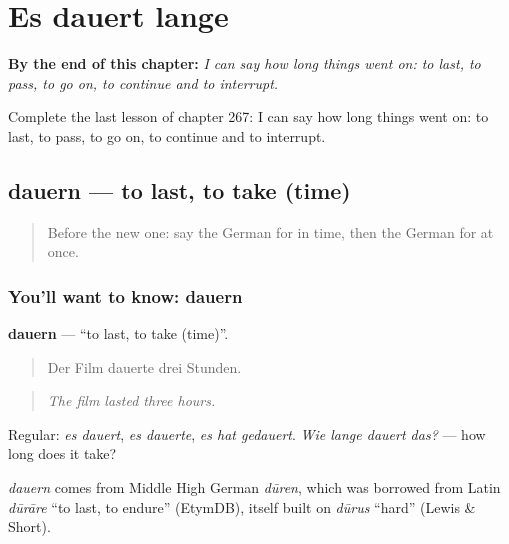 
\chapter{Es dauert lange}
\label{ch:ge-es-dauert-lange}

\begin{chapteropening}
\textbf{By the end of this chapter:} \emph{I can say how long things went on: to last, to pass, to go on, to continue and to interrupt.}

Complete the last lesson of chapter 267: I can say how long things went on: to last, to pass, to go on, to continue and to interrupt.
\end{chapteropening}

\section[dauern]{dauern — to last, to take (time)}

\label{lesson:GE-C267-dauern}



\begin{quote}
Before the new one: say the German for in time, then the German for at once.
\end{quote}

\subsection*{You'll want to know: dauern}
\textbf{dauern} — \textquotedblleft{}to last, to take (time)\textquotedblright{}.

\begin{quote}
Der Film dauerte drei Stunden.
\end{quote}

\begin{quote}
\emph{The film lasted three hours.}
\end{quote}

Regular: \emph{es dauert}, \emph{es dauerte}, \emph{es hat gedauert}. \emph{Wie lange dauert das?} — how long does it take?

\begin{cousinweb}
\emph{dauern} comes from Middle High German \emph{dūren}, which was borrowed from Latin \emph{dūrāre} \textquotedblleft{}to last, to endure\textquotedblright{} (EtymDB), itself built on \emph{dūrus} \textquotedblleft{}hard\textquotedblright{} (Lewis \& Short).
\end{cousinweb}

